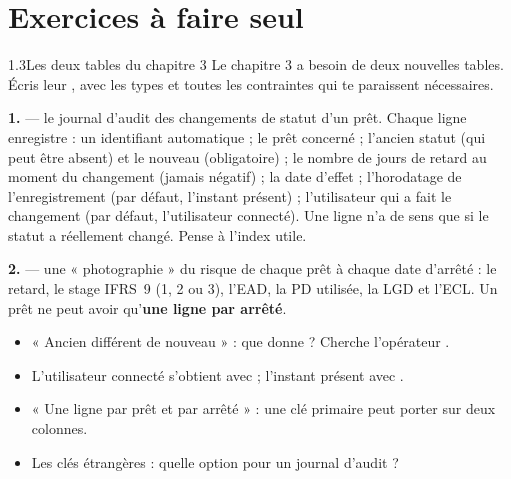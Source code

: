 \section{Exercices à faire seul}

\begin{exercice}{1.3}{Les deux tables du chapitre 3}
Le chapitre 3 a besoin de deux nouvelles tables. Écris leur , avec les types et
toutes les contraintes qui te paraissent nécessaires.

\textbf{1. } --- le journal d'audit des changements de statut d'un prêt. Chaque
ligne enregistre : un identifiant automatique ; le prêt concerné ; l'ancien statut (qui peut être
absent) et le nouveau (obligatoire) ; le nombre de jours de retard au moment du changement (jamais
négatif) ; la date d'effet ; l'horodatage de l'enregistrement (par défaut, l'instant présent) ;
l'utilisateur qui a fait le changement (par défaut, l'utilisateur connecté). Une ligne n'a de sens que
si le statut a réellement changé. Pense à l'index utile.

\textbf{2. } --- une « photographie » du risque de chaque prêt à chaque
date d'arrêté : le retard, le stage IFRS~9 (1, 2 ou 3), l'EAD, la PD utilisée, la LGD et l'ECL. Un prêt
ne peut avoir qu'\textbf{une ligne par arrêté}.
\end{exercice}

\begin{indice}
\begin{itemize}
\item « Ancien différent de nouveau » : que donne  ? Cherche l'opérateur
.
\item L'utilisateur connecté s'obtient avec  ; l'instant présent avec .
\item « Une ligne par prêt et par arrêté » : une clé primaire peut porter sur deux colonnes.
\item Les clés étrangères : quelle option  pour un journal d'audit ?
\end{itemize}
\end{indice}

